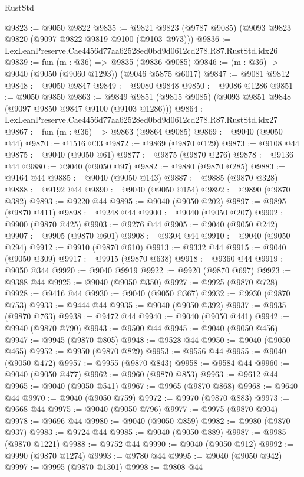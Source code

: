 \begin{lexlean}{RustStd}
\begin{coremodule}
{{@9823 := @9050 @9822
@9835 := @9821 @9823 (@9787 @9085) (@9093 @9823 @9820 (@9097 @9822 @9819 @9100 (@9103 @973)))
@9836 := LexLeanPreserve.Cae4456d77aa62528ed0bd9d0612cd278.R87.RustStd.idx26
@9839 := fun (m : @36) => @9835 (@9836 @9085)
@9846 := (m : @36) -> @9040 (@9050 (@9060 @1293)) (@9046 @5875 @6017)
@9847 := @9081 @9812
@9848 := @9050 @9847
@9849 := @9080 @9848
@9850 := @9086 @1286
@9851 := @9050 @9850
@9863 := @9849 @9851 (@9815 @9085) (@9093 @9851 @9848 (@9097 @9850 @9847 @9100 (@9103 @1286)))
@9864 := LexLeanPreserve.Cae4456d77aa62528ed0bd9d0612cd278.R87.RustStd.idx27
@9867 := fun (m : @36) => @9863 (@9864 @9085)
@9869 := @9040 (@9050 @44)
@9870 := @1516 @33
@9872 := @9869 (@9870 @129)
@9873 := @9108 @44
@9875 := @9040 (@9050 @61)
@9877 := @9875 (@9870 @276)
@9878 := @9136 @44
@9880 := @9040 (@9050 @97)
@9882 := @9880 (@9870 @285)
@9883 := @9164 @44
@9885 := @9040 (@9050 @143)
@9887 := @9885 (@9870 @328)
@9888 := @9192 @44
@9890 := @9040 (@9050 @154)
@9892 := @9890 (@9870 @382)
@9893 := @9220 @44
@9895 := @9040 (@9050 @202)
@9897 := @9895 (@9870 @411)
@9898 := @9248 @44
@9900 := @9040 (@9050 @207)
@9902 := @9900 (@9870 @425)
@9903 := @9276 @44
@9905 := @9040 (@9050 @242)
@9907 := @9905 (@9870 @601)
@9908 := @9304 @44
@9910 := @9040 (@9050 @294)
@9912 := @9910 (@9870 @610)
@9913 := @9332 @44
@9915 := @9040 (@9050 @309)
@9917 := @9915 (@9870 @638)
@9918 := @9360 @44
@9919 := @9050 @344
@9920 := @9040 @9919
@9922 := @9920 (@9870 @697)
@9923 := @9388 @44
@9925 := @9040 (@9050 @350)
@9927 := @9925 (@9870 @728)
@9928 := @9416 @44
@9930 := @9040 (@9050 @367)
@9932 := @9930 (@9870 @753)
@9933 := @9444 @44
@9935 := @9040 (@9050 @392)
@9937 := @9935 (@9870 @763)
@9938 := @9472 @44
@9940 := @9040 (@9050 @441)
@9942 := @9940 (@9870 @790)
@9943 := @9500 @44
@9945 := @9040 (@9050 @456)
@9947 := @9945 (@9870 @805)
@9948 := @9528 @44
@9950 := @9040 (@9050 @465)
@9952 := @9950 (@9870 @829)
@9953 := @9556 @44
@9955 := @9040 (@9050 @472)
@9957 := @9955 (@9870 @843)
@9958 := @9584 @44
@9960 := @9040 (@9050 @477)
@9962 := @9960 (@9870 @853)
@9963 := @9612 @44
@9965 := @9040 (@9050 @541)
@9967 := @9965 (@9870 @868)
@9968 := @9640 @44
@9970 := @9040 (@9050 @759)
@9972 := @9970 (@9870 @883)
@9973 := @9668 @44
@9975 := @9040 (@9050 @796)
@9977 := @9975 (@9870 @904)
@9978 := @9696 @44
@9980 := @9040 (@9050 @859)
@9982 := @9980 (@9870 @937)
@9983 := @9724 @44
@9985 := @9040 (@9050 @889)
@9987 := @9985 (@9870 @1221)
@9988 := @9752 @44
@9990 := @9040 (@9050 @912)
@9992 := @9990 (@9870 @1274)
@9993 := @9780 @44
@9995 := @9040 (@9050 @942)
@9997 := @9995 (@9870 @1301)
@9998 := @9808 @44
}}
\end{coremodule}
\end{lexlean}
